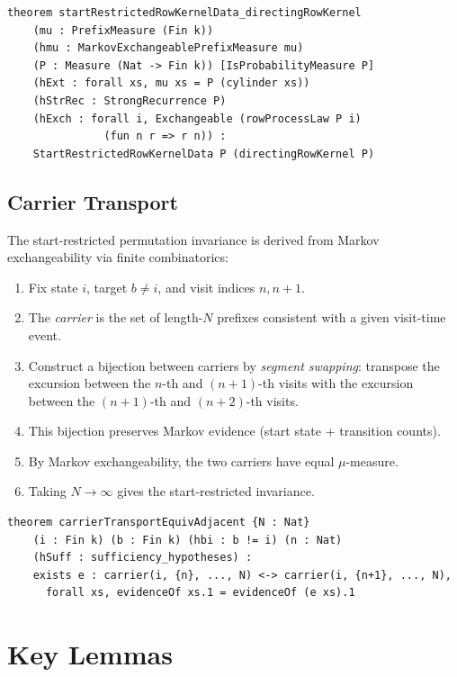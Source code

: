 \documentclass[11pt,a4paper]{article}
\theoremstyle{definition}
\begin{document}
\begin{lstlisting}
theorem startRestrictedRowKernelData_directingRowKernel
    (mu : PrefixMeasure (Fin k))
    (hmu : MarkovExchangeablePrefixMeasure mu)
    (P : Measure (Nat -> Fin k)) [IsProbabilityMeasure P]
    (hExt : forall xs, mu xs = P (cylinder xs))
    (hStrRec : StrongRecurrence P)
    (hExch : forall i, Exchangeable (rowProcessLaw P i)
               (fun n r => r n)) :
    StartRestrictedRowKernelData P (directingRowKernel P)
\end{lstlisting}

\subsection{Carrier Transport}

The start-restricted permutation invariance is derived from Markov
exchangeability via finite combinatorics:

\begin{enumerate}
\item Fix state $i$, target $b \neq i$, and visit indices $n, n+1$.
\item The \emph{carrier} is the set of length-$N$ prefixes consistent with
  a given visit-time event.
\item Construct a bijection between carriers by \emph{segment swapping}:
  transpose the excursion between the $n$-th and $(n+1)$-th visits with
  the excursion between the $(n+1)$-th and $(n+2)$-th visits.
\item This bijection preserves Markov evidence (start state + transition counts).
\item By Markov exchangeability, the two carriers have equal $\mu$-measure.
\item Taking $N \to \infty$ gives the start-restricted invariance.
\end{enumerate}

\begin{lstlisting}
theorem carrierTransportEquivAdjacent {N : Nat}
    (i : Fin k) (b : Fin k) (hbi : b != i) (n : Nat)
    (hSuff : sufficiency_hypotheses) :
    exists e : carrier(i, {n}, ..., N) <-> carrier(i, {n+1}, ..., N),
      forall xs, evidenceOf xs.1 = evidenceOf (e xs).1
\end{lstlisting}

\section{Key Lemmas}
\end{document}

